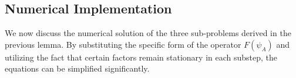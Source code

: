 \documentclass[preprint,11pt]{elsarticle}
\begin{document}

\subsection{Numerical Implementation}

We now discuss the numerical solution of the three sub-problems derived in the previous lemma. By substituting the specific form of the operator $F(\psi_A)$ and utilizing the fact that certain factors remain stationary in each substep, the equations can be simplified significantly.
\end{document}
